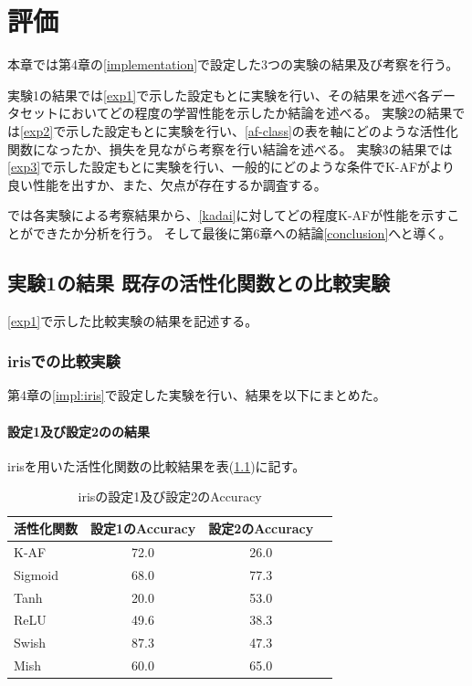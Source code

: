 \chapter{評価}
\label{evaluation}

本章では第4章の\ref{implementation}で設定した3つの実験の結果及び考察を行う。

実験1の結果\label{evo1}では\ref{exp1}で示した設定もとに実験を行い、その結果を述べ各データセットにおいてどの程度の学習性能を示したか結論を述べる。
実験2の結果\label{evo2}では\ref{exp2}で示した設定もとに実験を行い、\ref{af-class}の表を軸にどのような活性化関数になったか、損失を見ながら考察を行い結論を述べる。
実験3の結果\label{evo3}では\ref{exp3}で示した設定もとに実験を行い、一般的にどのような条件でK-AFがより良い性能を出すか、また、欠点が存在するか調査する。

\label{result}では各実験による考察結果から、\ref{kadai}に対してどの程度K-AFが性能を示すことができたか分析を行う。
そして最後に第6章への結論\ref{conclusion}へと導く。


\section{実験1の結果 既存の活性化関数との比較実験}
\label{evo1}
\ref{exp1}で示した比較実験の結果を記述する。

\subsection{irisでの比較実験}
\label{ev:iris}

第4章の\ref{impl:iris}で設定した実験を行い、結果を以下にまとめた。
\subsubsection{設定1及び設定2のの結果}

irisを用いた活性化関数の比較結果を表(\ref{result:iristable})に記す。

\begin{table}[htbp]
    \begin{center}
        \caption{irisの設定1及び設定2のAccuracy}
        \label{result:iristable}
        \vspace{2mm} 
        \begin{tabular}{l*{2}{c}r}
            活性化関数  & 設定1のAccuracy &  設定2のAccuracy \\
            \hline
            K-AF            & 72.0 & 26.0 \\
            Sigmoid            & 68.0 & 77.3\\
            Tanh            & 20.0 & 53.0\\
            ReLU        &  49.6 &  38.3\\
            Swish           & 87.3 & 47.3 \\
            Mish           & 60.0 & 65.0 \\
    
        \end{tabular}
    \end{center}
\end{table}


